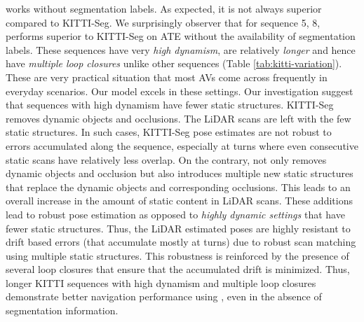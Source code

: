  \dslruda{} works without segmentation labels. As expected, it is not always superior compared to KITTI-Seg.
We surprisingly observer that for sequence 5, 8, \dslruda{} performs superior to KITTI-Seg on ATE without the availability of segmentation labels. These sequences have very \textit{high dynamism}, are relatively \textit{longer} and hence have \textit{multiple loop closures} unlike other sequences (Table \ref{tab:kitti-variation}). These are very practical situation that most AVs come across frequently in everyday scenarios. Our model excels in these settings. Our investigation suggest that sequences with high dynamism have fewer static structures. KITTI-Seg removes dynamic objects and occlusions. The LiDAR scans are left with the few static structures. In such cases, KITTI-Seg pose estimates are not robust to errors accumulated along the sequence, especially at turns where even consecutive static scans have relatively less overlap.  On the contrary, \dslruda{} not only removes dynamic objects and occlusion but also introduces multiple new static structures that replace the dynamic objects and corresponding occlusions. This leads to an overall increase in the amount of static content in LiDAR scans. These additions lead to robust pose estimation as opposed to \textit{highly dynamic settings} that have fewer static structures. Thus, the LiDAR estimated poses are highly resistant to drift based errors (that accumulate mostly at turns) due to robust scan matching using multiple static structures. This robustness is reinforced by the presence of several loop closures that ensure that the accumulated drift is minimized. Thus, longer KITTI sequences with high dynamism and multiple loop closures demonstrate better navigation performance using \dslruda{}, even in the absence of segmentation information.
\setlength{\tabcolsep}{0.8pt}
